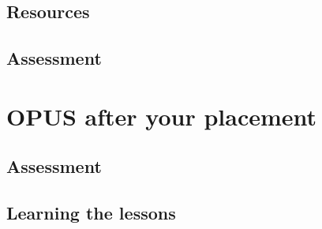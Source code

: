 \documentclass[12 pt]{book}
\begin{document}
\section{Resources}

\section{Assessment}

%
%
%

\chapter{OPUS after your placement}

\section{Assessment}

\section{Learning the lessons}

%
%

\printindex
{}
\end{document}

